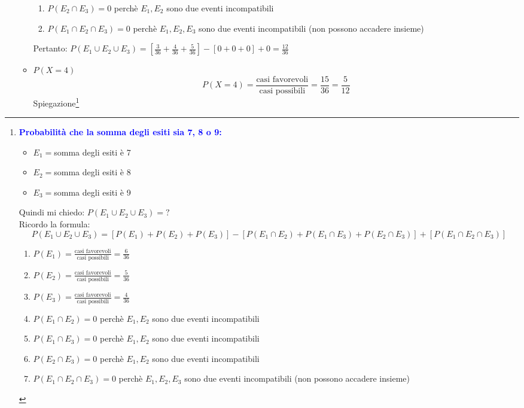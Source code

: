 \documentclass{article}  %
\theoremstyle{definition}
\begin{document}
\begin{esercizio}[Esercizio]
\begin{enumerate}
\begin{itemize}
{\begin{enumerate}
					            \item $P(E_2 \cap E_3)=0$ perchè $E_1,E_2$ sono due eventi incompatibili
					            \item $P(E_1 \cap E_2 \cap E_3)=0$ perchè $E_1,E_2,E_3$ sono due eventi incompatibili (non possono accadere insieme)
				            \end{enumerate}
				            Pertanto: $P(E_1 \cup E_2 \cup E_3)=\left[\frac{3}{36}+\frac{4}{36}+\frac{5}{36}\right]-\left[0+0+0\right]+0=\frac{12}{36}$
			            }
			      \item $P(X=4)$
			            \[
				            P(X=4)=\frac{\text{casi favorevoli}}{\text{casi possibili}}=\frac{15}{36}=\frac{5}{12}
			            \]
			            Spiegazione\footnote{\tiny
				            \textcolor{blue}{\textbf{Probabilità che la somma degli esiti sia 7, 8 o 9:}}
				            \begin{itemize}
					            \item $E_1=$somma degli esiti è 7
					            \item $E_2=$somma degli esiti è 8
					            \item $E_3=$somma degli esiti è 9
				            \end{itemize}
				            Quindi mi chiedo: $P(E_1 \cup E_2 \cup E_3)=?$ \\
				            Ricordo la formula:
				            \[
					            P(E_1 \cup E_2 \cup E_3)=\left[P(E_1)+P(E_2)+P(E_3)\right]-\left[P(E_1 \cap E_2)+P(E_1 \cap E_3)+P(E_2 \cap E_3)\right]+\left[P(E_1 \cap E_2 \cap E_3)\right]
				            \]
				            \begin{enumerate}
					            \item $P(E_1)=\frac{\text{casi favorevoli}}{\text{casi possibili}}=\frac{6}{36}$
					            \item $P(E_2)=\frac{\text{casi favorevoli}}{\text{casi possibili}}=\frac{5}{36}$
					            \item $P(E_3)=\frac{\text{casi favorevoli}}{\text{casi possibili}}=\frac{4}{36}$
					            \item $P(E_1 \cap E_2)=0$ perchè $E_1,E_2$ sono due eventi incompatibili
					            \item $P(E_1 \cap E_3)=0$ perchè $E_1,E_2$ sono due eventi incompatibili
					            \item $P(E_2 \cap E_3)=0$ perchè $E_1,E_2$ sono due eventi incompatibili
					            \item $P(E_1 \cap E_2 \cap E_3)=0$ perchè $E_1,E_2,E_3$ sono due eventi incompatibili (non possono accadere insieme)

\end{enumerate}}
\end{itemize}
\end{enumerate}
\end{esercizio}
\end{document}
